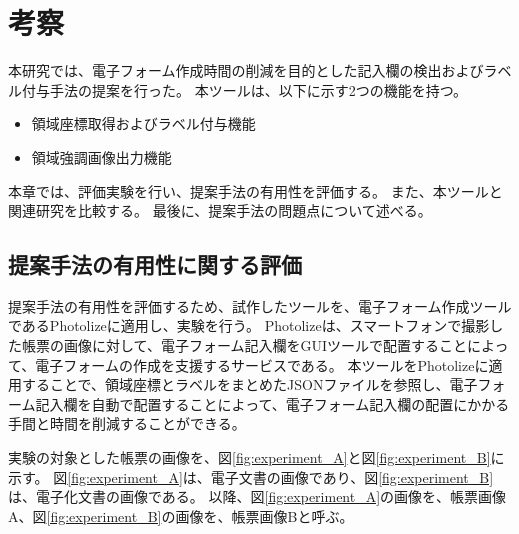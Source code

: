 \chapter{考察}\label{cha:Discussion}
本研究では、電子フォーム作成時間の削減を目的とした記入欄の検出およびラベル付与手法の提案を行った。
本ツールは、以下に示す2つの機能を持つ。

\begin{itemize}
  \item 領域座標取得およびラベル付与機能
  \item 領域強調画像出力機能
\end{itemize}

本章では、評価実験を行い、提案手法の有用性を評価する。
また、本ツールと関連研究を比較する。
最後に、提案手法の問題点について述べる。

\section{提案手法の有用性に関する評価}\label{sec:evalue_usefulness}
提案手法の有用性を評価するため、試作したツールを、電子フォーム作成ツールであるPhotolize\cite{Photolize}に適用し、実験を行う。
Photolizeは、スマートフォンで撮影した帳票の画像に対して、電子フォーム記入欄をGUIツールで配置することによって、電子フォームの作成を支援するサービスである。
本ツールをPhotolizeに適用することで、領域座標とラベルをまとめたJSONファイルを参照し、電子フォーム記入欄を自動で配置することによって、電子フォーム記入欄の配置にかかる手間と時間を削減することができる。

実験の対象とした帳票の画像を、図\ref{fig:experiment_A}と図\ref{fig:experiment_B}に示す。
図\ref{fig:experiment_A}は、電子文書の画像であり、図\ref{fig:experiment_B}は、電子化文書の画像である。
以降、図\ref{fig:experiment_A}の画像を、帳票画像A、図\ref{fig:experiment_B}の画像を、帳票画像Bと呼ぶ。

